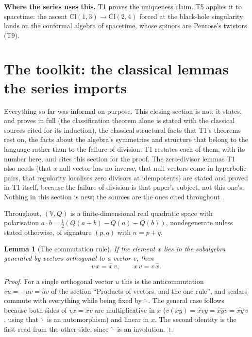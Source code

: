 \documentclass[11pt]{article}
\newtheorem{lemma}[theorem]{Lemma}
\theoremstyle{definition}
\theoremstyle{plain}
\providecommand{\Cl}{}\renewcommand{\Cl}{\mathrm{Cl}}
\begin{document}
\label{c:note.primer.setting-conformal-model-oldest-division-zero-2}
\textbf{Where the series uses this.} T1 proves the uniqueness claim. T5 applies it to spacetime: the ascent $\Cl(1,3) \to \Cl(2,4)$ forced at the black-hole singularity lands on the conformal algebra of spacetime, whose spinors are Penrose's twistors (T9).

\section{The toolkit: the classical lemmas the series imports}

\label{c:note.primer.setting-toolkit-classical-lemmas-series-imports}
Everything so far was informal on purpose. This closing section is not: it states, and proves in full (the classification theorem alone is stated with the classical sources cited for its induction), the classical structural facts that T1's theorems rest on, the facts about the algebra's symmetries and structure that belong to the language rather than to the failure of division. T1 restates each of them, with its number here, and cites this section for the proof. The zero-divisor lemmas T1 also needs (that a null vector has no inverse, that null vectors come in hyperbolic pairs, that regularity localises zero divisors at idempotents) are stated and proved in T1 itself, because the failure of division is that paper's subject, not this one's. Nothing in this section is new; the sources are the ones cited throughout \cite{Porteous1995, Lounesto2001, Lam2005, Chevalley1997, ABS1964}.

Throughout, $(\mathbb{V}, Q)$ is a finite-dimensional real quadratic space with polarisation $a \cdot b = \tfrac12(Q(a+b) - Q(a) - Q(b))$, nondegenerate unless stated otherwise, of signature $(p,q)$ with $n = p + q$.

\begin{lemma}[The commutation rule]\label{c:primer.commutation-rule}
If the element $x$ lies in the subalgebra generated by vectors orthogonal to a vector $v$, then
\begin{equation}
v\,x = \hat{x}\,v, \qquad x\,v = v\,\hat{x} .
\end{equation}
\end{lemma}
\begin{proof}
For a single orthogonal vector $u$ this is the anticommutation $vu = -uv = \hat{u}v$ of the section ``Products of vectors, and the one rule'', and scalars commute with everything while being fixed by $\hat{\cdot}$. The general case follows because both sides of $vx = \hat{x}v$ are multiplicative in $x$ ($v(xy) = \hat{x}vy = \hat{x}\hat{y}v = \widehat{xy}\,v$, using that $\hat{\cdot}$ is an automorphism) and linear in $x$. The second identity is the first read from the other side, since $\hat{\cdot}$ is an involution.

\end{proof}
\end{document}
